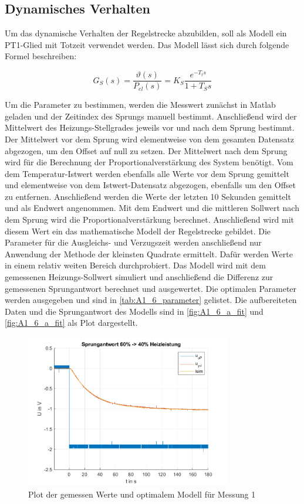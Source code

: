 \newpage


\subsection{Dynamisches Verhalten}

Um das dynamische Verhalten der Regelstrecke abzubilden, soll als Modell ein PT1-Glied mit Totzeit verwendet werden.  Das Modell lässt sich durch folgende Formel beschreiben:

\[ G_S\left(s\right) = \frac{\vartheta\left(s\right)}{P_{el}\left(s\right)} = K_S \frac{e^{-T_t s}}{1+T_S s}\]

Um die Parameter zu bestimmen, werden die Messwert zunächst in Matlab geladen und der Zeitindex des Sprungs manuell bestimmt. Anschließend wird der Mittelwert des Heizungs-Stellgrades jeweils vor und nach dem Sprung bestimmt. Der Mittelwert vor dem Sprung wird elementweise von dem gesamten Datensatz abgezogen, um den Offset auf null zu setzen. Der Mittelwert nach dem Sprung wird für die Berechnung der Proportionalverstärkung des System benötigt. Vom dem Temperatur-Istwert werden ebenfalls alle Werte vor dem Sprung gemittelt und elementweise von dem Istwert-Datensatz abgezogen, ebenfalls um den Offset zu entfernen. Anschließend werden die Werte der letzten 10 Sekunden gemittelt und als Endwert angenommen. Mit dem Endwert und die mittleren Sollwert nach dem Sprung wird die Proportionalverstärkung berechnet. Anschließend wird mit diesem Wert ein das mathematische Modell der Regelstrecke gebildet. Die Parameter für die Ausgleichs- und Verzugszeit werden anschließend nur Anwendung der Methode der kleinsten Quadrate ermittelt. Dafür werden Werte in einem relativ weiten Bereich durchprobiert. Das Modell wird mit dem gemessenen Heizungs-Sollwert simuliert und anschließend die Differenz zur gemessenen Sprungantwort berechnet und ausgewertet. Die optimalen Parameter werden ausgegeben und sind in \autoref{tab:A1_6_parameter} gelistet. Die aufbereiteten Daten und die Sprungantwort des Modells sind in \autoref{fig:A1_6_a_fit} und \autoref{fig:A1_6_a_fit} als Plot dargestellt.

\begin{figure}[h]
    \begin{center}
        \includegraphics[width=0.8\textwidth]{img/A1_6_a.png}
        \caption{Plot der gemessen Werte und optimalem Modell für Messung 1}
        \label{fig:A1_6_a_fit}
    \end{center}
\end{figure}

